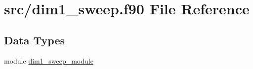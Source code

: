 \hypertarget{dim1__sweep_8f90}{\section{src/dim1\-\_\-sweep.f90 File Reference}
\label{dim1__sweep_8f90}
}
\subsection*{Data Types}
\begin{DoxyCompactItemize}
\item 
module \hyperlink{classdim1__sweep__module}{dim1\-\_\-sweep\-\_\-module}
\end{DoxyCompactItemize}
